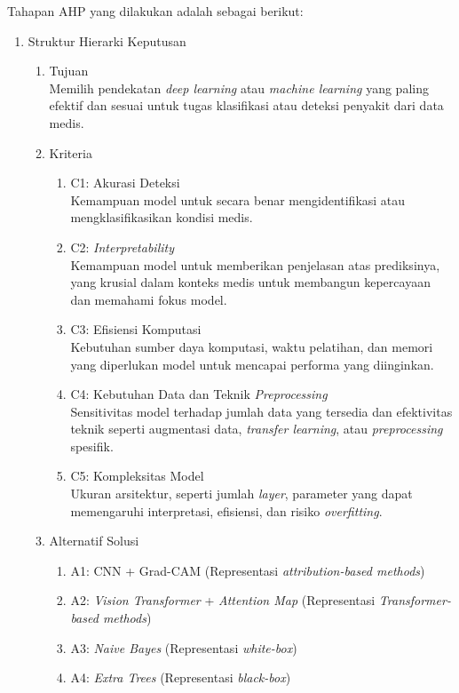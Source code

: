 Tahapan AHP yang dilakukan adalah sebagai berikut:
\begin{enumerate}
	\item Struktur Hierarki Keputusan
	\begin{enumerate}
		\item Tujuan \\
		Memilih pendekatan \textit{deep learning} atau \textit{machine learning} yang paling efektif dan sesuai untuk tugas klasifikasi atau deteksi penyakit dari data medis.
		\item Kriteria
		\begin{enumerate}
			\item C1: Akurasi Deteksi \\
			Kemampuan model untuk secara benar mengidentifikasi atau mengklasifikasikan kondisi medis.
			\item C2: \textit{Interpretability} \\
			Kemampuan model untuk memberikan penjelasan atas prediksinya, yang krusial dalam konteks medis untuk membangun kepercayaan dan memahami fokus model.
			\item C3: Efisiensi Komputasi \\
			Kebutuhan sumber daya komputasi, waktu pelatihan, dan memori yang diperlukan model untuk mencapai performa yang diinginkan.
			\item C4: Kebutuhan Data dan Teknik \textit{Preprocessing}\\
			Sensitivitas model terhadap jumlah data yang tersedia dan efektivitas teknik seperti augmentasi data, \textit{transfer learning}, atau \textit{preprocessing} spesifik.
			\item C5: Kompleksitas Model \\
			Ukuran arsitektur, seperti jumlah \textit{layer}, parameter yang dapat memengaruhi interpretasi, efisiensi, dan risiko \textit{overfitting}.
		\end{enumerate}
		\item Alternatif Solusi
		\begin{enumerate}
			\item A1: CNN + Grad-CAM (Representasi \textit{attribution-based methods})
			\item A2: \textit{Vision Transformer} + \textit{Attention Map }(Representasi \textit{Transformer-based methods})
			\item A3: \textit{Naive Bayes} (Representasi \textit{white-box})
			\item A4: \textit{Extra Trees} (Representasi \textit{black-box})
		\end{enumerate}

\end{enumerate}
\end{enumerate}
